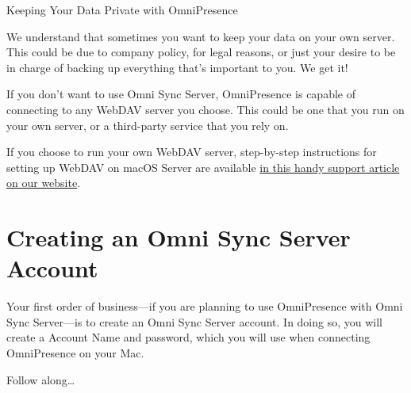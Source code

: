 \documentclass[../main.tex]{subfiles}
\begin{document}
\begin{ogsidebar}
  Keeping Your Data Private with OmniPresence

  We understand that sometimes you want to keep your data on your own server. This could be due
  to company policy, for legal reasons, or just your desire to be in charge of backing up
  everything that's important to you. We get it!

  If you don't want to use Omni Sync Server, OmniPresence is capable of connecting to any WebDAV
  server you choose. This could be one that you run on your own server, or a third-party
  service that you rely on.

  If you choose to run your own WebDAV server, step-by-step instructions for setting up WebDAV
  on macOS Server are available
  \href{http://support.omnigroup.com/omnipresence-os-x-server}{in this handy support article
  on our website}.
\end{ogsidebar}

\section{Creating an Omni Sync Server Account}

Your first order of business---if you are planning to use OmniPresence with Omni Sync
Server---is to create an Omni Sync Server account. In doing so, you will create a Account Name
and password, which you will use when connecting OmniPresence on your Mac.

Follow along\ldots{}
\end{document}
